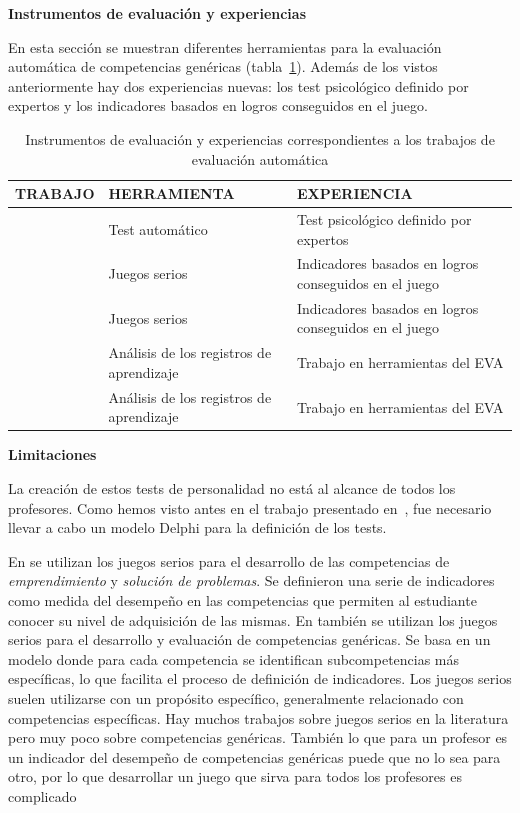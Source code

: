 \bigskip
\textbf{Instrumentos de evaluación y experiencias}
\bigskip

En esta sección se muestran diferentes herramientas para la evaluación automática de competencias genéricas (tabla~\ref{tab:MetodosAutomaticos}). Además de los vistos anteriormente hay dos experiencias nuevas: los test psicológico definido por expertos y los indicadores basados en logros conseguidos en el juego.

\begin{table}
  \begin{center}
  \begin{tabular}{| c | m{4.5cm} | m{6.5cm} |}
    \hline
    TRABAJO & HERRAMIENTA & EXPERIENCIA \\
    \hline
    \hline
    \cite{andre2011formal} & Test automático  & Test psicológico definido por expertos \\
    \hline
    \cite{guenaga2013serious} & Juegos serios  & Indicadores basados en logros conseguidos en el juego \\
    \hline
    \cite{bedek2011behavioral} & Juegos serios & Indicadores basados en logros conseguidos en el juego  \\
    \hline
    \cite{rayon2014web} & Análisis de los registros de aprendizaje  & Trabajo en herramientas del EVA \\
    \hline
    \cite{fidalgo:2015} & Análisis de los registros de aprendizaje & Trabajo en herramientas del EVA \\
    \hline
  \end{tabular}
\end{center}
\caption{Instrumentos de evaluación y experiencias correspondientes a los trabajos de evaluación automática}
\label{tab:MetodosAutomaticos}
\end{table} 


\bigskip
\textbf{Limitaciones}
\bigskip

La creación de estos tests de personalidad no está al alcance de todos los profesores. Como hemos visto antes en el trabajo presentado en~\cite{andre2011formal}, fue necesario llevar a cabo un modelo Delphi para la definición de los tests.

En \cite{guenaga2013serious} se utilizan los juegos serios para el desarrollo de las competencias de \emph{emprendimiento} y \emph{solución de problemas}. Se definieron una serie de indicadores como medida del desempeño en las competencias que permiten al estudiante conocer su nivel de adquisición de las mismas. En \cite{bedek2011behavioral} también se utilizan los juegos serios para el desarrollo y evaluación de competencias genéricas. Se basa en un modelo donde para cada competencia se identifican subcompetencias más específicas, lo que facilita el proceso de definición de indicadores. Los juegos serios suelen utilizarse con un propósito específico, generalmente relacionado con competencias específicas. Hay muchos trabajos sobre juegos serios en la literatura pero muy poco sobre competencias genéricas. También lo que para un profesor es un indicador del desempeño de competencias genéricas puede que no lo sea para otro, por lo que desarrollar un juego que sirva para todos los profesores es complicado %


